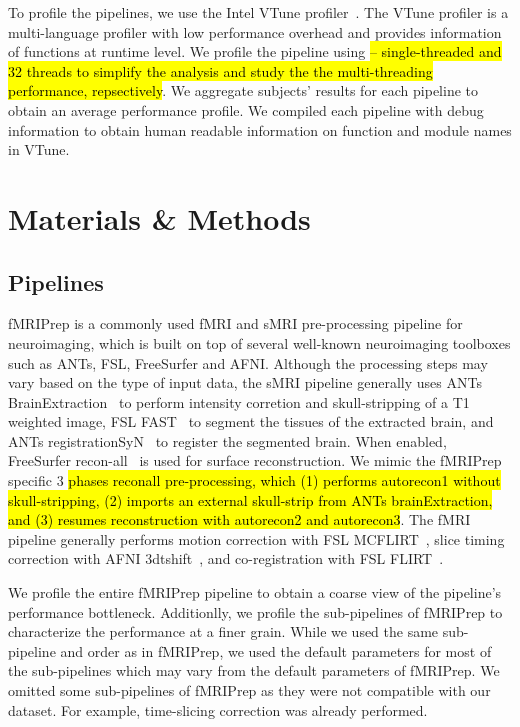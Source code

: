 \documentclass[conference]{IEEEtran}
\newcommand{\HL}[1]{\hl{#1}}
\begin{document}
To profile the pipelines, we use the Intel VTune profiler~\cite{vtune-profiler}. The VTune profiler is a multi-language profiler with low performance overhead and provides information of functions at runtime level. We profile the pipeline using \HL{-- single-threaded and 32 threads to simplify the analysis and study the the multi-threading performance, repsectively}. We aggregate subjects' results for each pipeline to obtain an average performance profile. We compiled each pipeline with debug information to obtain human readable information on function and module names in VTune.

\section{Materials \& Methods}
\subsection{Pipelines}

fMRIPrep is a commonly used fMRI and sMRI pre-processing pipeline for neuroimaging, which is built on top of several well-known neuroimaging toolboxes such as ANTs, FSL, FreeSurfer and AFNI. Although the processing steps may vary based on the type of input data, the sMRI pipeline generally uses ANTs BrainExtraction~\cite{Tustison2010-gg,Avants2008-ea} to perform intensity corretion and skull-stripping of a T1 weighted image, FSL FAST~\cite{Zhang2001-hx} to segment the tissues of the extracted brain, and ANTs registrationSyN~\cite{Avants2008-ea} to register the segmented brain. When enabled, FreeSurfer recon-all~\cite{Dale1999-wu} is used for surface reconstruction. We mimic the fMRIPrep specific 3 \HL{phases reconall pre-processing, which (1) performs autorecon1 without skull-stripping, (2) imports an external skull-strip from ANTs brainExtraction, and (3) resumes reconstruction with autorecon2 and autorecon3}. The fMRI pipeline generally performs motion correction with FSL MCFLIRT~\cite{Jenkinson2002-od}, slice timing correction with AFNI 3dtshift~\cite{Cox1996-nk}, and co-registration with FSL FLIRT~\cite{Jenkinson2002-od,Jenkinson2001-eu,Greve2009-dw}.

We profile the entire fMRIPrep pipeline to obtain a coarse view of the pipeline's performance bottleneck. Additionlly, we profile the sub-pipelines of fMRIPrep to characterize the performance at a finer grain. While we used the same sub-pipeline and order as in fMRIPrep, we used the default parameters for most of the sub-pipelines which may vary from the default parameters of fMRIPrep. We omitted some sub-pipelines of fMRIPrep as they were not compatible with our dataset. For example, time-slicing correction was already performed.
\end{document}

